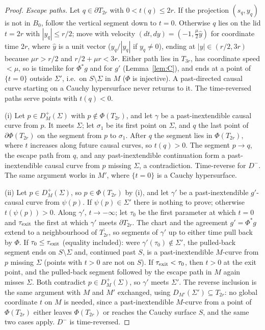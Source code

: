 \documentclass[11pt]{article}
\theoremstyle{definition}
\begin{document}
\begin{proof}
\emph{Escape paths.} Let $q\in\partial T_{2r}$ with $0<t(q)\le2r$. If the
projection $(s_q,y_q)$ is not in $B_0$, follow the vertical segment down to
$t=0$. Otherwise $q$ lies on the lid $t=2r$ with $|y_q|\le r/2$; move with
velocity $(dt,dy)=(-1,\tfrac\mu2\hat y)$ for coordinate time $2r$, where $\hat y$
is a unit vector ($y_q/|y_q|$ if $y_q\neq0$), ending at $|y|\in(r/2,3r)$
because $\mu r>r/2$ and $r/2+\mu r<3r$. Either path lies in $T_{3r}$, has
coordinate speed $<\mu$, so is timelike for $\Phi^*g$ and for $g'$
(Lemma~\ref{lem:C}), and ends at a point of $\{t=0\}$ outside $\Sigma'$, i.e.\ on
$S\setminus\Sigma$ in $M$ ($\Phi$ is injective). A past-directed causal curve
starting on a Cauchy hypersurface never returns to it. The time-reversed paths
serve points with $t(q)<0$.

(i) Let $p\in D^+_M(\Sigma)$ with $p\notin\Phi(T_{2r})$, and let $\gamma$ be a
past-inextendible causal curve from $p$. It meets $\Sigma$; let $\sigma_1$ be
its first point on $\Sigma$, and $q$ the last point of $\partial\Phi(T_{2r})$ on
the segment from $p$ to $\sigma_1$. After $q$ the segment lies in
$\Phi(T_{2r})$, where $t$ increases along future causal curves, so $t(q)>0$.
The segment $p\to q$, the escape path from $q$, and any past-inextendible
continuation form a past-inextendible causal curve from $p$ missing $\Sigma$, a
contradiction. Time-reverse for $D^-$. The same argument works in $M'$, where
$\{t=0\}$ is a Cauchy hypersurface.

(ii) Let $p\in D^+_M(\Sigma)$, so $p\in\Phi(T_{2r})$ by (i), and let
$\gamma'$ be a past-inextendible $g'$-causal curve from $\psi(p)$. If
$\psi(p)\in\Sigma'$ there is nothing to prove; otherwise $t(\psi(p))>0$. Along
$\gamma'$, $t\to-\infty$; let $\tau_0$ be the first parameter at which $t=0$ and
$\tau_{\rm exit}$ the first at which $\gamma'$ meets $\partial T_{2r}$. The chart
and the agreement $g'=\Phi^*g$ extend to a neighbourhood of
$\overline{T_{2r}}$, so segments of $\gamma'$ up to either time pull back by
$\Phi$. If $\tau_0\le\tau_{\rm exit}$ (equality included): were
$\gamma'(\tau_0)\notin\Sigma'$, the pulled-back segment ends on $S\setminus\Sigma$
and, continued past $S$, is a past-inextendible $M$-curve from $p$ missing
$\Sigma$ (points with $t>0$ are not on $S$). If $\tau_{\rm exit}<\tau_0$, then
$t>0$ at the exit point, and the pulled-back segment followed by the escape
path in $M$ again misses $\Sigma$. Both contradict $p\in D^+_M(\Sigma)$, so $\gamma'$
meets $\Sigma'$. The reverse inclusion is the same argument with $M$ and $M'$
exchanged, using $D_{M'}(\Sigma')\subseteq T_{2r}$: no global coordinate $t$ on
$M$ is needed, since a past-inextendible $M$-curve from a point of
$\Phi(T_{2r})$ either leaves $\Phi(T_{2r})$ or reaches the Cauchy surface $S$,
and the same two cases apply. $D^-$ is time-reversed.


\end{proof}
\end{document}
